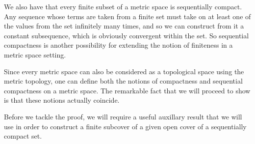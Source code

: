  We also have that every finite subset of a metric space is sequentially compact. Any sequence whose terms are taken from a finite set must take on at least one of the values from the set infinitely many times, and so we can construct from it a constant subsequence, which is obviously convergent within the set. So sequential compactness is another possibility for extending the notion of finiteness in a metric space setting.

 \vspace{3mm}

 Since every metric space can also be considered as a topological space using the metric topology, one can define both the notions of compactness and sequential compactness on a metric space. The remarkable fact that we will proceed to show is that these notions actually coincide.

 \vspace{3mm}

 Before we tackle the proof, we will require a useful auxillary result that we will use in order to construct a finite subcover of a given open cover of a sequentially compact set.

